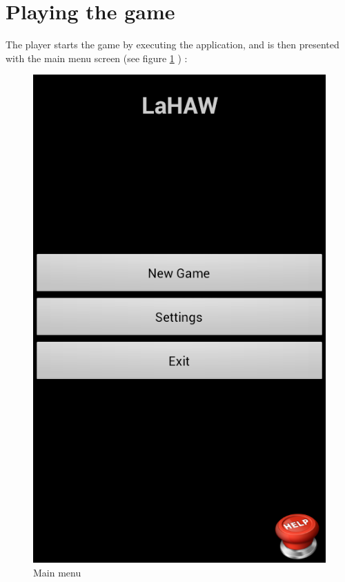 \section{Playing the game}
The player starts the game by executing the application, and is then presented with the main menu screen (see figure \ref{fig:mainmenu} ) :
\begin{figure}[ht]
	\begin{minipage}[b]{0.325\linewidth}
		\centering
		\includegraphics[scale=0.225]{img/Screenshot_MainMenu.png}
		\caption{Main menu      }
		\label{fig:mainmenu}
	\end{minipage}
	\begin{minipage}[b]{0.325\linewidth}

\end{minipage}
\end{figure}
